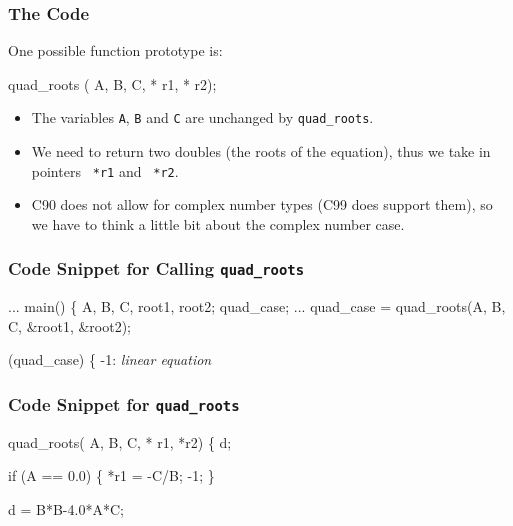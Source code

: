 \documentclass[smaller,handout,table]{beamer}
\begin{document}
\begin{frame}[fragile]
\frametitle{The Code}
One possible function prototype is:
\begin{semiverbatim}
 quad_roots ( A,  B,  C,
                 * r1,  * r2);
\end{semiverbatim}
\begin{itemize}
\item The variables {\tt A}, {\tt B} and {\tt C} are unchanged by {\tt quad\_roots}.
\item We need to return two doubles (the roots of the equation), thus we take in pointers {\tt {} *r1} and {\tt {} *r2}.
\item C90 does not allow for complex number types (C99 does support them), so we have to think a little bit about the complex number case.
\end{itemize}
\end{frame}

\begin{frame}[fragile]
\frametitle{Code Snippet for Calling {\tt quad\_roots}}
\begin{semiverbatim}
...
 main()
\{
    A, B, C, root1, root2;
    quad_case;   
   ...   
   quad\_case = quad\_roots(A, B, C, \&root1,
                          \&root2);
                          
   (quad\_case)
   \{
    -1: \emph{linear equation}
\end{semiverbatim}
\end{frame}

\begin{frame}[fragile]
\frametitle{Code Snippet for {\tt quad\_roots}}
\begin{semiverbatim}
 quad\_roots( A,  B,  C,
                * r1,  *r2)
\{
    d;
   
   if (A == 0.0)
   \{
      *r1 = -C/B;
       -1;
   \}
          
   d = B*B-4.0*A*C;
\end{semiverbatim}
\end{frame}
\end{document}
